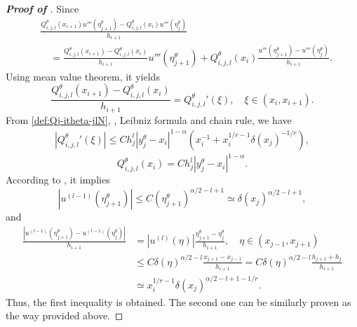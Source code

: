 \documentclass{amsart}
\theoremstyle{definition}
\theoremstyle{remark}
\numberwithin{equation}{section}
\begin{document}
\begin{proof} [\bf Proof of ]
  \label{prf:dQj-itle}
  Since
  \begin{equation*}
    \begin{aligned}
       & \frac{{Q_{i,j,l}^\theta}(x_{i+1}) u'''(\eta_{j+1}^\theta) - {Q_{i,j,l}^\theta}(x_{i}) u'''(\eta_{j}^\theta)}{h_{i+1}}  \\
       & \quad = \frac{Q_{i,j,l}^\theta(x_{i+1}) - Q_{i,j,l}^\theta(x_{i})}{h_{i+1}} u'''(\eta_{j+1}^\theta)
      + Q_{i,j,l}^\theta(x_i) \frac{u'''(\eta_{j+1}^\theta)-u'''(\eta_{j}^\theta)}{h_{i+1}}    .
    \end{aligned}
  \end{equation*}
  Using mean value theorem, it yields
  \begin{equation*}
    \frac{Q_{i,j,l}^\theta(x_{i+1}) - Q_{i,j,l}^\theta(x_{i})}{h_{i+1}} = {Q_{i,j,l}^\theta}'(\xi), \quad \xi \in (x_{i}, x_{i+1}).
  \end{equation*}
  From \eqref{def:Qj-itheta-jlN}, , Leibniz formula and chain rule, we have
  \begin{equation*}
    \begin{aligned}
      |{Q_{i,j,l}^\theta}'(\xi)| \le C h_j^l |y_{j}^\theta - x_{i}|^{1-\alpha} (x_i^{-1} + x_i^{1/r-1} \delta(x_j)^{-1/r}),
    \end{aligned}
  \end{equation*}
  \begin{equation*}
    Q_{i,j,l}^\theta(x_i) = C h_{j}^l |y_j^\theta-x_i|^{1-\alpha}.
  \end{equation*}
  According to , it implies
  \begin{equation*}
    |u^{(l-1)}(\eta_{j+1}^\theta)| \le C (\eta_{j+1}^\theta)^{\alpha/2-l+1} 
    \simeq \delta(x_j)^{\alpha/2-l+1},
  \end{equation*}
  and
  \begin{equation*}
    \begin{aligned}
      \frac{|u^{(l-1)}(\eta_{j+1}^\theta)-u^{(l-1)}(\eta_{j}^\theta)|}{h_{i+1}}
      &= |u^{(l)}(\eta)| \frac{\eta_{j+1}^\theta - \eta_{j}^\theta}{h_{i+1}}  , \quad \eta \in (x_{j-1}, x_{j+1})\\
      & \le C \delta(\eta)^{\alpha/2-l} \frac{x_{j+1}-x_{j-1}}{h_{i+1}}
      = C \delta(\eta)^{\alpha/2-l} \frac{h_{j+1}+h_{j}}{h_{i+1}} \\
      & \simeq x_i^{1/r-1} \delta(x_j)^{\alpha/2-l+1-1/r} .
    \end{aligned}
  \end{equation*}
  Thus, the first inequality is obtained.
  The second one can be similarly proven as the way provided above.
\end{proof}
    










\end{document}
